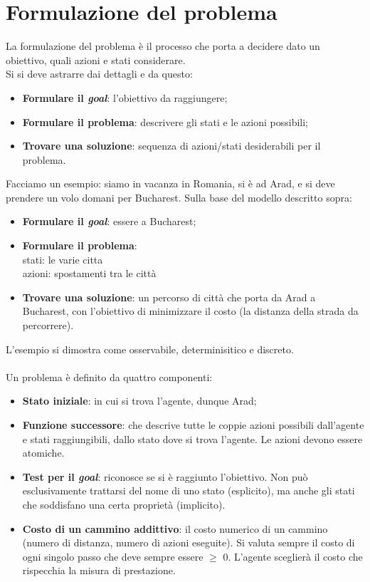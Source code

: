 \documentclass[10pt,a4paper]{book}
\begin{document}
\section{Formulazione del problema}
La formulazione del problema \`e il processo che porta a decidere dato un obiettivo, quali azioni e stati considerare.\\
Si si deve astrarre dai dettagli e da questo:
\begin{itemize}
\item \textbf{Formulare il \textit{goal}}: l'obiettivo da raggiungere;
\item \textbf{Formulare il problema}: descrivere gli stati e le azioni possibili;
\item \textbf{Trovare una soluzione}: sequenza di azioni/stati desiderabili per il problema.
\end{itemize}
\noindent
Facciamo un esempio: siamo in vacanza in Romania, si \`e ad Arad, e si deve prendere un volo domani per Bucharest. Sulla base del modello descritto sopra:
\begin{itemize}
\item \textbf{Formulare il \textit{goal}}: essere a Bucharest;
\item \textbf{Formulare il problema}:\\ stati: le varie citta\\
azioni: spostamenti tra le citt\`a
\item \textbf{Trovare una soluzione}: un percorso di citt\`a che porta da Arad a Bucharest, con l'obiettivo di minimizzare il costo (la distanza della strada da percorrere).
\end{itemize}
\noindent
L'esempio si dimostra come osservabile, determinisitico e discreto.\\\\
Un problema \`e definito da quattro componenti:
\begin{itemize}
\item  \textbf{Stato iniziale}: in cui si trova l'agente, dunque Arad;
\item  \textbf{Funzione successore}: che descrive tutte le coppie azioni possibili dall'agente e stati raggiungibili, dallo stato dove si trova l'agente. Le azioni devono essere atomiche.
\item  \textbf{Test per il \textit{goal}}: riconosce se si \`e raggiunto l'obiettivo. Non pu\`o esclusivamente trattarsi del nome di uno stato (esplicito), ma anche gli stati che soddisfano una certa propriet\`a (implicito).
\item  \textbf{Costo di un cammino addittivo}: il costo numerico di un cammino (numero di distanza, numero di azioni eseguite).  Si valuta sempre il costo di ogni singolo passo che deve sempre essere $\ge$ 0. L'agente sceglier\`a il costo che rispecchia la misura di prestazione.
\end{itemize}
\end{document}
